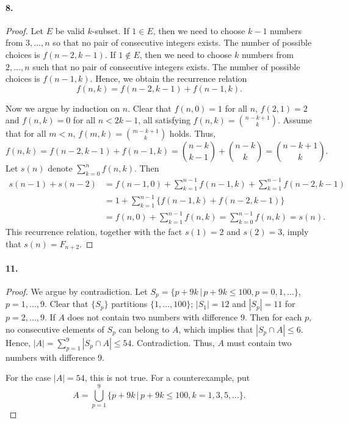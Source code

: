   \paragraph{8.}
  \begin{proof}
    Let $E$ be valid $k$-subset. If $1\in  E$, then we need to choose $k-1$
    numbers from $3,\dots,n$ so that no pair of consecutive integers exists. 
    The number of possible choices is $f(n-2,k-1)$. If $1\notin E$, then we 
    need to choose $k$ numbers from $2,\dots,n$ such that no pair of 
    consecutive integers exists. The number of possible choices is $f(n-1,k)$.
    Hence, we obtain the recurrence relation
    \[
      f(n,k)=f(n-2,k-1)+f(n-1,k).
    \]\par
    Now we argue by induction on $n$. Clear that $f(n,0)=1$ for all $n$, 
    $f(2,1)=2$ and $f(n,k)=0$ for all $n<2k-1$, all satisfying $f(n,k)=
    \binom{n-k+1}{k}$. Assume that for all $m<n$, $f(m,k)=\binom{m-k+1}{k}$ 
    holds. Thus,
    \[
      f(n,k)=f(n-2,k-1)+f(n-1,k)=
      \binom{n-k}{k-1}+\binom{n-k}{k}=\binom{n-k+1}{k}.
    \]
    Let $s(n)$ denote $\sum_{k=0}^nf(n,k)$. Then
    \begin{align*}
      s(n-1)+s(n-2)
      &=f(n-1,0)+\sum_{k=1}^{n-1}f(n-1,k)+\sum_{k=1}^{n-1}f(n-2,k-1) \\
      &=1+\sum_{k=1}^{n-1}\{f(n-1,k)+f(n-2,k-1)\} \\
      &= f(n,0)+\sum_{k=1}^{n-1}f(n,k)=\sum_{k=0}^{n-1}f(n,k)=s(n).
    \end{align*}
    This recurrence relation, together with the fact $s(1)=2$ and $s(2)=3$, 
    imply that $s(n)=F_{n+2}$.
  \end{proof}
  
  \paragraph{11.}
  \begin{proof}
    We argue by contradiction. Let $S_p=\{p+9k\,|\,p+9k\le 100, p=0,1,\dots\}$, 
    $p=1,\dots,9$. Clear that $\{S_p\}$ partitions $\{1,\dots,100\}$; $|S_1|
    =12$ and $|S_p|=11$ for $p=2,\dots,9$. If $A$ does not contain two numbers 
    with difference $9$. Then for each $p$, no consecutive elements of $S_p$ 
    can belong to $A$, which implies that $|S_p\cap A|\le 6$. Hence, $|A|=
    \sum_{p=1}^9|S_p\cap A|\le 54$. Contradiction. Thus, $A$ must contain two
    numbers with difference $9$.\par
    For the case $|A|=54$, this is not true. For a counterexample, put
    \[
      A=\bigcup_{p=1}^9\{p+9k\,|\,p+9k\le 100, k=1,3,5,\dots\}.
    \]
  \end{proof}

















